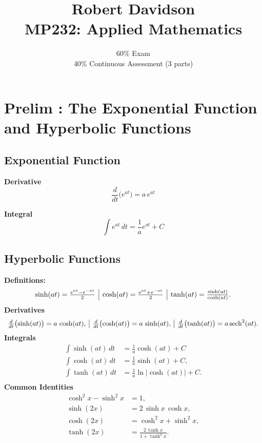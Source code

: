 \documentclass[a4paper, 10pt]{article}
\title{
Robert Davidson \\
\textbf{MP232: Applied Mathematics}
}
\author{
60\% Exam\\
40\% Continuous Assessment (3 parts)
}
\date{} %
\begin{document}
\maketitle

\tableofcontents

\pagebreak



\section{Prelim : The Exponential Function and Hyperbolic Functions}
\subsection{Exponential Function}
\noindent \begin{minipage}{0.45\textwidth}
  \textbf{Derivative}
  $$\frac{d}{dt}\bigl(e^{at}\bigr) = a\,e^{at}$$
\end{minipage}\hfill
\noindent \begin{minipage}{0.45\textwidth}
  \textbf{Integral}
  $$\int e^{at}\,dt = \frac{1}{a}e^{at} + C$$
\end{minipage}\hfill



\subsection{Hyperbolic Functions}

\textbf{Definitions:}
$$
  \begin{array}{c | c | c}
    \sinh(at) = \frac{e^{at} - e^{-at}}{2}
     &
    \cosh(at) = \frac{e^{at} + e^{-at}}{2}
     &
    \tanh(at) = \frac{\sinh(at)}{\cosh(at)}.
  \end{array}
$$
\textbf{Derivatives}
$$
  \begin{array}{c | c | c}
    \frac{d}{dt}\bigl(\sinh(at)\bigr) = a\,\cosh(at),
     &
    \frac{d}{dt}\bigl(\cosh(at)\bigr) = a\,\sinh(at),
     &
    \frac{d}{dt}\bigl(\tanh(at)\bigr) = a\,\mathrm{sech}^2(at).
  \end{array}
$$
\textbf{Integrals}
\begin{align*}
  \int \sinh(at)\,dt & = \frac{1}{a}\cosh(at) + C                 \\
  \int \cosh(at)\,dt & = \frac{1}{a}\sinh(at) + C,                \\
  \int \tanh(at)\,dt & = \frac{1}{a}\ln\bigl|\cosh(at)\bigr| + C. \\
\end{align*}
\textbf{Common Identities}
\begin{align*}
  \cosh^2 x - \sinh^2 x & = 1,                                \\
  \sinh(2x)             & = 2\,\sinh x\,\cosh x,              \\
  \cosh(2x)             & = \cosh^2 x + \sinh^2 x,            \\
  \tanh(2x)             & = \frac{2\,\tanh x}{1 + \tanh^2 x}.
\end{align*}
\end{document}
